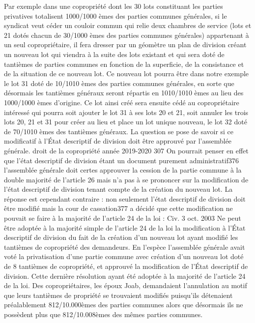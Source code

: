 		Par exemple dans une copropriété dont les 30 lots constituant les parties privatives totalisent 1000/1000 èmes des parties communes générales, si le syndicat veut céder un couloir commun qui relie deux chambres de service (lots  et 21 dotés chacun de 30/1000 èmes des parties communes générales) appartenant à un seul copropriétaire, il fera dresser par un géomètre un plan de division créant un nouveau lot qui viendra à la suite des lots existant et qui sera doté de tantièmes de parties communes en fonction de la superficie, de la consistance et de la situation de ce nouveau lot. Ce nouveau lot pourra être dans notre exemple le lot 31 doté de 10/1010 èmes des parties communes générales, en sorte que désormais les tantièmes généraux seront répartis en 1010/1010 èmes au lieu des 1000/1000 èmes d'origine. Ce lot ainsi créé sera ensuite cédé au copropriétaire intéressé qui pourra soit ajouter le lot 31 à ses lots 20 et 21, soit annuler les trois lots 20, 21 et 31 pour créer au lieu et place un lot unique nouveau, le lot 32 doté de 70/1010 èmes des tantièmes généraux.
		La question se pose de savoir si ce modificatif à l’État descriptif de division doit être approuvé par l’assemblée générale.
		droit de la copropriété année 2019-2020
		307
		On pourrait penser en effet que l’état descriptif de division étant un document purement administratif376 l’assemblée générale doit certes approuver la cession de la partie commune à la double majorité de l’article 26 mais n’a pas à se prononcer sur la modification de l’état descriptif de division tenant compte de la création du nouveau lot.
		La réponse est cependant contraire : non seulement l’état descriptif de division doit être modifié mais la cour de cassation377 a décidé que cette modification ne pouvait se faire à la majorité de l’article 24 de la loi : Civ. 3 oct. 2003
		Ne peut être adoptée à la majorité simple de l’article 24 de la loi la modification à l’État descriptif de division du fait de la création d’un nouveau lot ayant modifié les tantièmes de copropriété des demandeurs.
		En l’espèce l’assemblée générale avait voté la privatisation d’une partie commune avec création d’un nouveau lot doté de 8 tantièmes de copropriété, et approuvé la modification de l’État descriptif de division. Cette dernière résolution ayant été adoptée à la majorité de l’article 24 de la loi. Des copropriétaires, les époux Joab, demandaient l’annulation au motif que leurs tantièmes de propriété se trouvaient modifiés puisqu’ils détenaient préalablement 812/10.000èmes des parties communes alors que désormais ils ne possèdent plus que 812/10.008èmes des mêmes parties communes.
